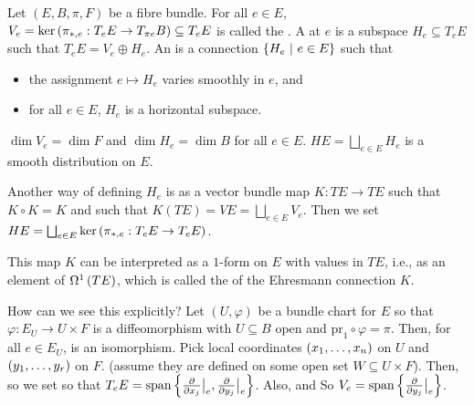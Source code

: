 \documentclass[main.tex]{subfiles}
\begin{document}
  \begin{defn}
      Let $(E, B ,\pi, F)$ be a fibre bundle. For all $e \in E$, $V_e = \ker \left(  \pi_{*, e} : T_e E \to T_{\pi{e}}B  \right) \subseteq T_e E$ is called the . A  at $e$ is a subspace $H_e \subseteq T_eE$ such that $T_e E = V_e \oplus H_e$. An  is a connection $\left\{H_e \ | \  e \in E\right\}$ such that
      \begin{itemize}
        \item the assignment $e \mapsto H_e$ varies smoothly in $e$, and
        \item for all $e \in E$, $H_e$ is a horizontal subspace.
      \end{itemize}
  \end{defn}

  \begin{note}
    $\dim V_e = \dim F$ and $\dim H_e = \dim B$ for all $e \in E$. $HE = \bigsqcup_{e \in E} H_e$ is a smooth distribution on $E$.
  \end{note}

  Another way of defining $H_e$ is as a vector bundle map $K: TE \to TE$ such that $K \circ K = K$ and such that $K(TE) = VE = \bigsqcup_{e \in E} V_e$. Then we set $HE = \bigsqcup_{e \in E} \ker\left(  \pi_{*, e}: T_e E \to T_e E \right)$.

  This map $K$ can be interpreted as a $1$-form on $E$ with values in $TE$,  i.e., as an element of $\Omega^{1}\left( TE \right)$, which is called the  of the Ehresmann connection $K$.

  How can we see this explicitly? Let $(U, \varphi)$ be a bundle chart for $E$ so that $\varphi: E_U \to U \times F$ is a diffeomorphism with $U \subseteq B$ open and $\text{pr}_1 \circ \varphi = \pi$. Then, for all $e \in E_U$,
  is an isomorphism. Pick local coordinates $\left( x_1, \dots, x_n \right)$ on $U$ and $\left( y_1, \dots, y_r \right)$ on $F$. (assume they are defined on some open set $W \subseteq U \times F$). Then,
  so we set
  so that $T_e E = \text{span}\left\{\frac{ \partial  }{ \partial x_j }\big|_{e}, \frac{ \partial  }{ \partial y_j }\big|_{e}\right\}$. Also,
   and
    So $V_e = \text{span}\left\{ \frac{ \partial  }{ \partial y_j }\big|_{e} \right\}$.
\end{document}
